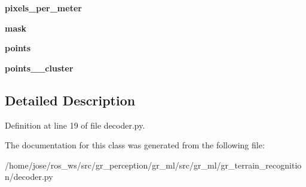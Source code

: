 \begin{DoxyCompactItemize}
{\bfseries pixels\+\_\+per\+\_\+meter}
\item 
\mbox{\label{classgr__ml_1_1gr__terrain__recognition_1_1decoder_1_1ImageToPc_aff81ef84b94845089c41f758fba6fee1}} 
{\bfseries mask}
\item 
\mbox{\label{classgr__ml_1_1gr__terrain__recognition_1_1decoder_1_1ImageToPc_aea24aa2106549bf1a6f327078def2c93}} 
{\bfseries points}
\item 
\mbox{\label{classgr__ml_1_1gr__terrain__recognition_1_1decoder_1_1ImageToPc_a4ef1e12fc4441694af5ba498cfbe04e4}} 
{\bfseries points\+\_\+\_\+cluster}
\end{DoxyCompactItemize}


\subsection{Detailed Description}


Definition at line 19 of file decoder.\+py.



The documentation for this class was generated from the following file\+:\begin{DoxyCompactItemize}
\item 
/home/jose/ros\+\_\+ws/src/gr\+\_\+perception/gr\+\_\+ml/src/gr\+\_\+ml/gr\+\_\+terrain\+\_\+recognition/decoder.\+py\end{DoxyCompactItemize}
